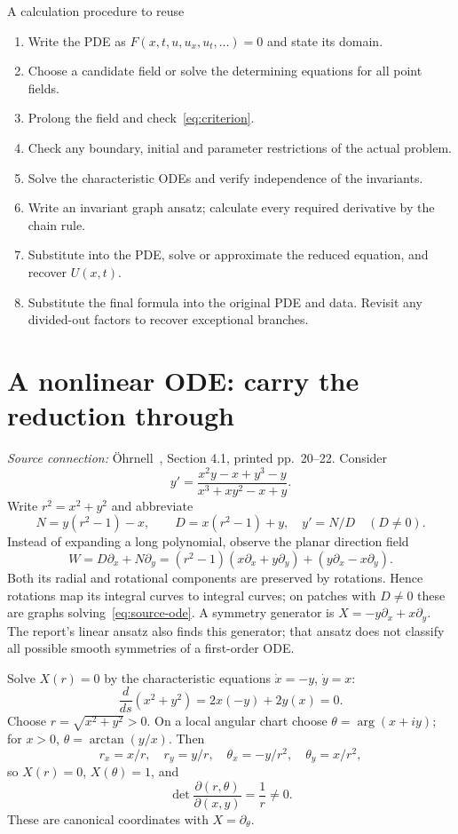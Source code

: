 \documentclass[11pt,a4paper]{article}
\numberwithin{equation}{section}
\theoremstyle{definition}
\theoremstyle{plain}
\theoremstyle{remark}
\newcommand{\source}[1]{\textit{Source connection:} \"Ohrnell~\cite{ohrnell}, #1.}
\begin{document}
\begin{idea}{A calculation procedure to reuse}
\begin{enumerate}
\item Write the PDE as $F(x,t,u,u_x,u_t,\ldots)=0$ and state its domain.
\item Choose a candidate field or solve the determining equations for all point fields.
\item Prolong the field and check~\eqref{eq:criterion}.
\item Check any boundary, initial and parameter restrictions of the actual problem.
\item Solve the characteristic ODEs and verify independence of the invariants.
\item Write an invariant graph ansatz; calculate every required derivative by the chain rule.
\item Substitute into the PDE, solve or approximate the reduced equation, and recover $U(x,t)$.
\item Substitute the final formula into the original PDE and data. Revisit any divided-out factors to recover exceptional branches.
\end{enumerate}
\end{idea}

\section{A nonlinear ODE: carry the reduction through}\label{sec:ode}
\source{Section 4.1, printed pp.~20--22}
Consider
\begin{equation}\label{eq:source-ode}
y'=\frac{x^2y-x+y^3-y}{x^3+xy^2-x+y}.
\end{equation}
Write $r^2=x^2+y^2$ and abbreviate
\[
N=y(r^2-1)-x,\qquad D=x(r^2-1)+y,
\quad y'=N/D\quad(D\ne0).
\]
Instead of expanding a long polynomial, observe the planar direction field
\[
W=D\partial_x+N\partial_y
=(r^2-1)(x\partial_x+y\partial_y)+(y\partial_x-x\partial_y).
\]
Both its radial and rotational components are preserved by rotations. Hence rotations map its integral curves to integral curves; on patches with $D\ne0$ these are graphs solving~\eqref{eq:source-ode}. A symmetry generator is $X=-y\partial_x+x\partial_y$. The report's linear ansatz also finds this generator; that ansatz does not classify all possible smooth symmetries of a first-order ODE.

Solve $X(r)=0$ by the characteristic equations $\dot x=-y$, $\dot y=x$:
\[
\frac{d}{ds}(x^2+y^2)=2x(-y)+2y(x)=0.
\]
Choose $r=\sqrt{x^2+y^2}>0$. On a local angular chart choose $\theta=\arg(x+iy)$; for $x>0$, $\theta=\arctan(y/x)$. Then
\[
r_x=x/r,\quad r_y=y/r,\quad
\theta_x=-y/r^2,\quad\theta_y=x/r^2,
\]
so $X(r)=0$, $X(\theta)=1$, and
\[
\det\frac{\partial(r,\theta)}{\partial(x,y)}=\frac1r\ne0.
\]
These are canonical coordinates with $X=\partial_\theta$.
\end{document}
